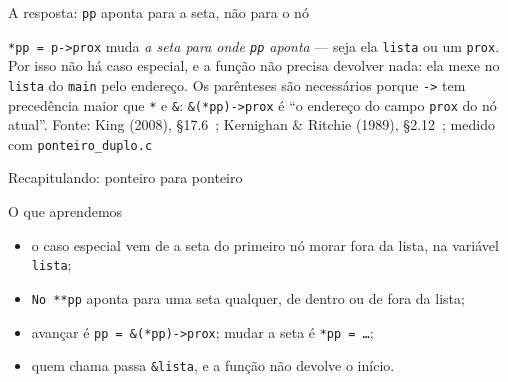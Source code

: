 \documentclass[aspectratio=169]{beamer}
\newcommand{\ptr}[1]{($(#1.one split north)!0.5!(#1.south east)$)}
\newcommand{\fonte}[1]{\vfill\hfill{\scriptsize\textcolor{UFSGray}{Fonte: #1}}}
\begin{document}
\begin{frame}{A resposta: \texttt{pp} aponta para a seta, não para o nó}
  \begin{center}
  \end{center}
  \small
  \texttt{*pp = p->prox} muda \emph{a seta para onde \texttt{pp} aponta} ---
  seja ela \texttt{lista} ou um \texttt{prox}. Por isso não há caso
  especial, e a função não precisa devolver nada: ela mexe no
  \texttt{lista} do \texttt{main} pelo endereço. Os parênteses são
  necessários porque \texttt{->} tem precedência maior que \texttt{*} e
  \texttt{\&}: \texttt{\&(*pp)->prox} é ``o endereço do campo
  \texttt{prox} do nó atual''.
  \fonte{King (2008), §17.6~\cite{king2008c};
    Kernighan \& Ritchie (1989), §2.12~\cite{kernighan1989c};
    medido com \texttt{ponteiro\_duplo.c}}
\end{frame}

\begin{frame}{Recapitulando: ponteiro para ponteiro}
  \begin{block}{O que aprendemos}
    \begin{itemize}
      \item o caso especial vem de a seta do primeiro nó morar fora da
        lista, na variável \texttt{lista};
      \item \texttt{No **pp} aponta para uma seta qualquer, de dentro ou de
        fora da lista;
      \item avançar é \texttt{pp = \&(*pp)->prox}; mudar a seta é
        \texttt{*pp = \ldots};
      \item quem chama passa \texttt{\&lista}, e a função não devolve o
        início.
    \end{itemize}
  \end{block}
\end{frame}
\end{document}
